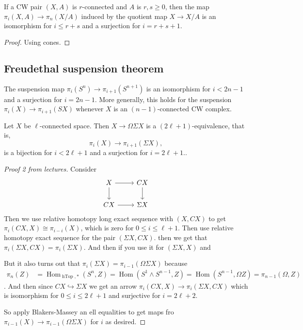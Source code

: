 \begin{prop}
	If a CW pair $(X,A)$ is $r$-connected and $A$ is $r,s \geq 0$, then the map $\pi_{i}(X,A)\to \pi_{n}(X/A)$ induced by the quotient map $X\to X/A$ is an isomorphism for $i\leq r+s$ and a surjection for $i=r+s+1$.
\end{prop}
\begin{proof}
	Using cones.
\end{proof}

\subsection{Freudethal suspension theorem}

\begin{coro}
	The suspension map $\pi_{i}(S^{n})\to \pi_{i+1}(S^{n+1})$ is an isomorphism for $i<2n-1$ and a surjection for $i=2n-1$. More generally, this holds for the suspension $\pi_{i}(X)\to \pi_{i+1}(SX)$ whenever $X$ is an $(n-1)$-connected CW complex.
\end{coro}
\begin{thm}
		Let $X$ be $\ell$-connected space. Then $X\to\Omega\Sigma X$ is a $(2\ell+1)$-equivalence, that is,
	\[\pi_i(X)\to \pi_{i+1}(\Sigma X),\]
	is a bijection for $i<2\ell+1$ and a surjection for $i=2\ell+1$..
\end{thm}
\begin{proof}[Proof 2 from lectures]
	Consider
	\[\begin{tikzcd}
		X\arrow[r]\arrow[d]&CX\arrow[d]\\
		CX\arrow[r]&\Sigma X
	\end{tikzcd}\]
	Then we use relative homotopy long exact sequence with $(X,CX)$ to get $\pi_i(CX,X)\cong\pi_{i-i}(X)$, which is zero for $0\leq i\leq \ell+1$. Then use relative homotopy exact sequence for the pair $(\Sigma X,CX)$. then we get that $\pi_i(\Sigma X,CX)=\pi_i(\Sigma X)$. And then if you use it for $(\Sigma X, X)$ and 
	
	But it also turns out that $\pi_i(\Sigma X)=\pi_{i-1}(\Omega\Sigma X)$ because
	\begin{align*}
		\pi_n(Z)&=\operatorname{Hom}_{\operatorname{hTop},*}(S^n,Z)=\operatorname{Hom}(S^1\wedge S^{n-1},Z)=\operatorname{Hom}(S^{n-1},\Omega Z)=\pi_{n-1}(\Omega,Z)
	\end{align*}.
	And then since $CX\hookrightarrow \Sigma X$ we get an arrow $\pi_i(CX,X)\to\pi_i(\Sigma X,CX)$ which is isomorphism for $0\leq i \leq 2\ell +1$ and surjective for $i=2\ell+2$.
	
	So apply Blakers-Massey an ell equalities to get maps fro $\pi_{i-1}(X)\to\pi_{i-1}(\Omega\Sigma X)$ for $i$ as desired.
\end{proof}
